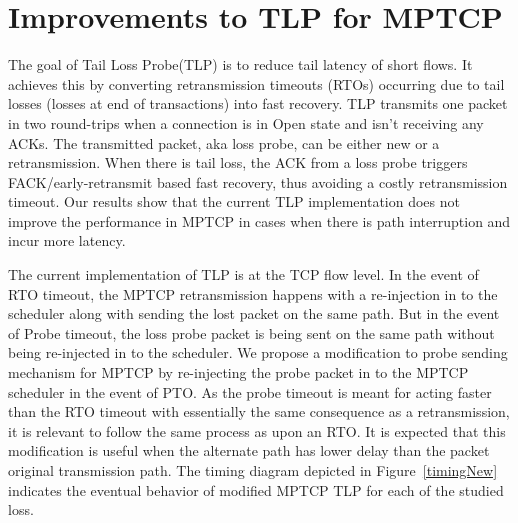 \documentclass[10pt,conference,compsoc]{IEEEtran}
\begin{document}


\section{Improvements to TLP for MPTCP}\label{impr}
The goal of Tail Loss Probe(TLP) is to reduce tail latency of short flows. It achieves this by converting retransmission timeouts (RTOs) occurring due to tail losses (losses at end of transactions) into fast recovery. TLP transmits one packet in two round-trips when a connection is in Open state and isn't receiving any ACKs. The transmitted packet, aka loss probe, can be either new or a retransmission. When there is tail loss, the ACK from a loss probe triggers FACK/early-retransmit based fast recovery, thus avoiding a costly retransmission timeout. Our results show that the current TLP implementation does not improve the performance in MPTCP in cases when there is path interruption and incur more latency.

The current implementation of TLP is at the TCP flow level. In the event of RTO timeout, the MPTCP retransmission happens with a re-injection in to the scheduler along with sending the lost packet on the same path. But in the event of Probe timeout, the loss probe packet is being sent on the same path without being re-injected in to the scheduler. We propose a modification to probe sending mechanism for MPTCP by re-injecting the probe packet in to the MPTCP scheduler in the event of PTO. As the probe timeout is meant for acting faster than the RTO timeout with essentially the same consequence as a retransmission, it is relevant to follow the same process as upon an RTO. It is expected that this modification is useful when the alternate path has lower delay than the packet original transmission path. The timing diagram depicted in Figure~\ref{timingNew} indicates the eventual behavior of modified MPTCP TLP for each of the studied loss. 
\end{document}

